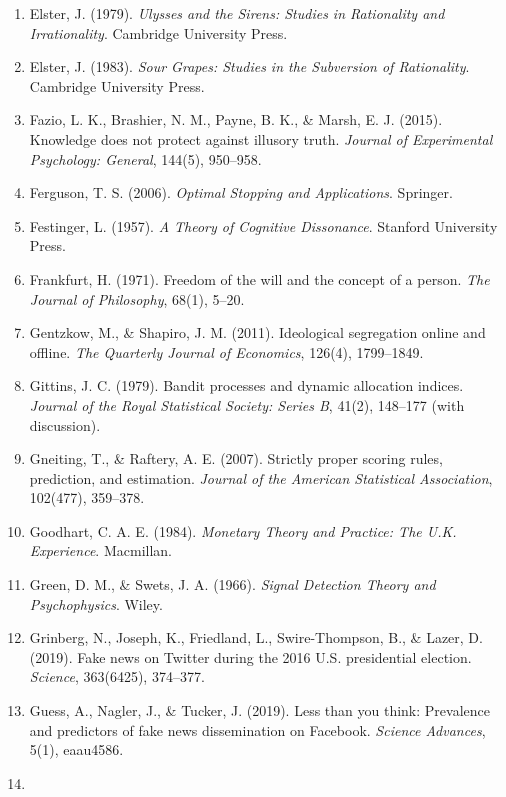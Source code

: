 \documentclass[
  11pt]{article}
\begin{document}
\begin{enumerate}
  Elish, M. C. (2019). Moral crumple zones: Cautionary tales in
  human-robot interaction. \emph{Engaging Science, Technology, and
  Society}, 5, 40--60.
\item
  Elster, J. (1979). \emph{Ulysses and the Sirens: Studies in
  Rationality and Irrationality}. Cambridge University Press.
\item
  Elster, J. (1983). \emph{Sour Grapes: Studies in the Subversion of
  Rationality}. Cambridge University Press.
\item
  Fazio, L. K., Brashier, N. M., Payne, B. K., \& Marsh, E. J. (2015).
  Knowledge does not protect against illusory truth. \emph{Journal of
  Experimental Psychology: General}, 144(5), 950--958.
\item
  Ferguson, T. S. (2006). \emph{Optimal Stopping and Applications}.
  Springer.
\item
  Festinger, L. (1957). \emph{A Theory of Cognitive Dissonance}.
  Stanford University Press.
\item
  Frankfurt, H. (1971). Freedom of the will and the concept of a person.
  \emph{The Journal of Philosophy}, 68(1), 5--20.
\item
  Gentzkow, M., \& Shapiro, J. M. (2011). Ideological segregation online
  and offline. \emph{The Quarterly Journal of Economics}, 126(4),
  1799--1849.
\item
  Gittins, J. C. (1979). Bandit processes and dynamic allocation
  indices. \emph{Journal of the Royal Statistical Society: Series B},
  41(2), 148--177 (with discussion).
\item
  Gneiting, T., \& Raftery, A. E. (2007). Strictly proper scoring rules,
  prediction, and estimation. \emph{Journal of the American Statistical
  Association}, 102(477), 359--378.
\item
  Goodhart, C. A. E. (1984). \emph{Monetary Theory and Practice: The
  U.K. Experience}. Macmillan.
\item
  Green, D. M., \& Swets, J. A. (1966). \emph{Signal Detection Theory
  and Psychophysics}. Wiley.
\item
  Grinberg, N., Joseph, K., Friedland, L., Swire-Thompson, B., \& Lazer,
  D. (2019). Fake news on Twitter during the 2016 U.S. presidential
  election. \emph{Science}, 363(6425), 374--377.
\item
  Guess, A., Nagler, J., \& Tucker, J. (2019). Less than you think:
  Prevalence and predictors of fake news dissemination on Facebook.
  \emph{Science Advances}, 5(1), eaau4586.
\item

\end{enumerate}
\end{document}
